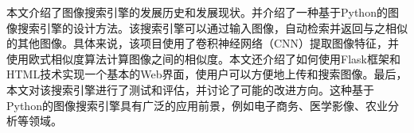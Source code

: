 
\cnabstract

本文介绍了图像搜索引擎的发展历史和发展现状。并介绍了一种基于Python的图像搜索引擎的设计方法。该搜索引擎可以通过输入图像，自动检索并返回与之相似的其他图像。具体来说，该项目使用了卷积神经网络（CNN）提取图像特征，并使用欧式相似度算法计算图像之间的相似度。本文还介绍了如何使用Flask框架和HTML技术实现一个基本的Web界面，使用户可以方便地上传和搜索图像。最后，本文对该搜索引擎进行了测试和评估，并讨论了可能的改进方向。这种基于Python的图像搜索引擎具有广泛的应用前景，例如电子商务、医学影像、农业分析等领域。


